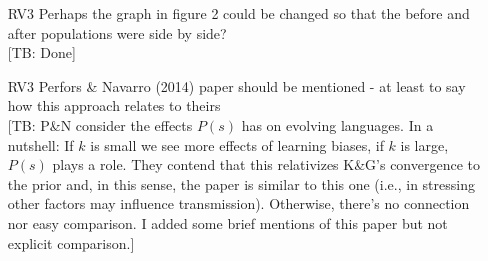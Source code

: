 \documentclass[10pt,a4paper]{article}
\newcommand{\tb}[1]{\textcolor[rgb]{.8,.33,.0}{[TB: #1]}}%
\newcommand{\type}[1]{\ensuremath{\tau_{#1}}}
\newcommand{\postparameter}{\ensuremath{\gamma}}
\begin{document}
\begin{itemize}
\begin{itemize}
	\item $t$ is both {\em teacher} and {\em type}\\ \tb{True. Now \type{} for {\em type}}
	\item $l$ is both {\em learner} and {\em posterior parameter}\\ \tb{True. Now \postparameter~ for {\em posterior parameter}}
	\item $a$ to index actual state is counterintuitive\\ \tb{Disagree. I'd leave it as is.}
	\item Switch from $s_l$ to $s_p$ in case studies\\ \tb{Done. $s_p$ was purged.}
	\item Consistent distinction between $P_N$ and $P$ (e.g. first two equations on p.2)\\
	\tb{Done}
	\item $P(t|d_l)$: $s$ is not defined within the binomial; is the sum in $succ\_prob$ really over $t$ (not $d$)?\\ \tb{Everything seems correct to me. With more space it would help to clarify how summing up to $\type{}-1$ in {\em succ.prob} relates to the speaker behavior of teacher of type \type{}, which is the confusing bit in this term. Then again, we at least have an intuitive explanation of the formula so I hope we're fine with only 1/3 of the reviewers being confused by this.}
	\item write out the binomial pmf, not its parameterisation on p.4\\ \tb{I find our formulation easier to parse, so I left it. But if you think it's non-standard we can replace it by the pmf}
	\item scalar d vs sequence/vector d\\ \tb{Haven't caught where $d$ is allegedly used as a scalar}
      \end{itemize}
    \item [RV3] Perhaps the graph in figure 2 could be changed so that the before and after populations were side by side?\\ \tb{Done}
    \item [RV3] Perfors \& Navarro (2014) paper should be mentioned - at least to say how this approach relates to theirs \\ \tb{P\&N consider the effects $P(s)$ has on evolving languages. In a nutshell: If $k$ is small we see more effects of learning biases, if $k$ is large, $P(s)$ plays a role. They contend that this relativizes K\&G's convergence to the prior and, in this sense, the paper is similar to this one (i.e., in stressing other factors may influence transmission). Otherwise, there's no connection nor easy comparison. I added some brief mentions of this paper but not explicit comparison.}
  \end{itemize}
\end{document}

